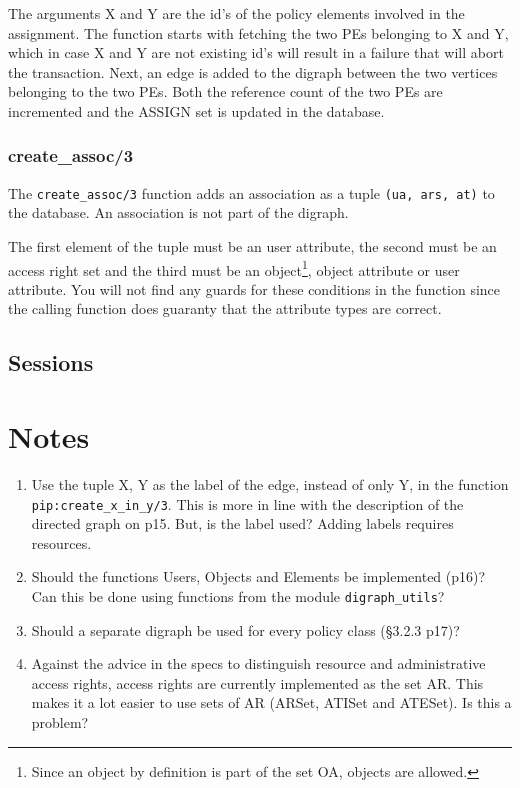 \documentclass[12pt,a4paper,titlepage]{book}
\begin{document}
		  The arguments X and Y are the id's of the policy elements involved in the assignment. The function starts with fetching the two PEs belonging to X and Y, which in case X and Y are not existing id's will result in a failure that will abort the transaction. Next, an edge is added to the digraph between the two vertices belonging to the two PEs. Both the reference count of the two PEs are incremented and the ASSIGN set is updated in the database.
		  
	\subsection{create\_assoc/3}
	
		The \lstinline|create_assoc/3| function adds an association as a tuple \lstinline|(ua, ars, at)| to the database. An association is not part of the digraph.
		
		The first element of the tuple must be an user attribute, the second must be an access right set and the third must be an object\footnote{Since an object by definition is part of the set OA, objects are allowed.}, object attribute or user attribute. You will not find any guards for these conditions in the function since the calling function does guaranty that the attribute types are correct.
	
	\section{Sessions}
	
	\chapter{Notes}
	
	\begin{enumerate}

		\item Use the tuple {X, Y} as the label of the edge, instead of only Y, in the function \lstinline|pip:create_x_in_y/3|. This is more in line with the description of the directed graph on p15. But, is the label used? Adding labels requires resources.
		
		\item Should the functions Users, Objects and Elements be implemented (p16)? Can this be done using functions from the module \lstinline|digraph_utils|?
		
		\item Should a separate digraph be used for every policy class (\S 3.2.3 p17)?
		
		\item Against the advice in the specs to distinguish resource and administrative access rights, access rights are currently implemented as the set AR. This makes it a lot easier to use sets of AR (ARSet, ATISet and ATESet). Is this a problem?
		
		

	\end{enumerate}
	
	
	
\end{document}
